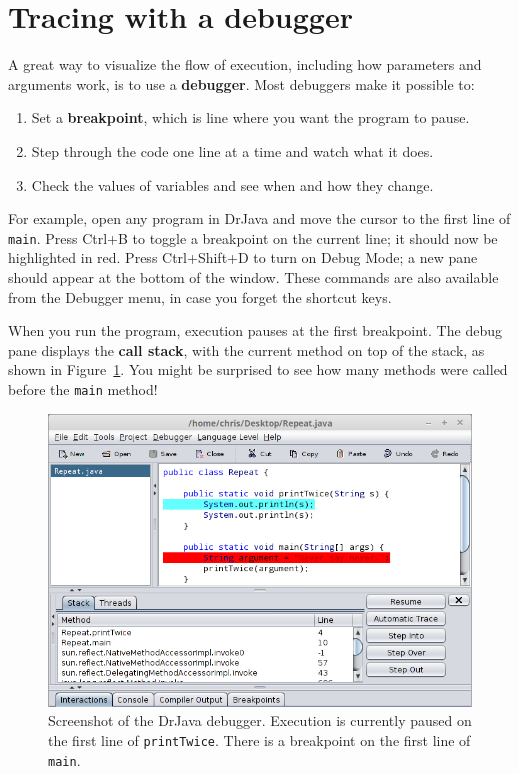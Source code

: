 \documentclass[12pt]{book}
\theoremstyle{exercise}
\newcommand{\java}[1]{\verb"#1"}
\begin{document}
\section{Tracing with a debugger}
\label{debugger}


A great way to visualize the flow of execution, including how parameters and arguments work, is to use a {\bf debugger}.
Most debuggers make it possible to:


\begin{enumerate}
\item Set a {\bf breakpoint}, which is line where you want the program to pause.
\item Step through the code one line at a time and watch what it does.
\item Check the values of variables and see when and how they change.
\end{enumerate}

For example, open any program in DrJava and move the cursor to the first line of \java{main}.
Press {\sf Ctrl+B} to toggle a breakpoint on the current line; it should now be highlighted in red.
Press {\sf Ctrl+Shift+D} to turn on Debug Mode; a new pane should appear at the bottom of the window.
These commands are also available from the {\sf Debugger} menu, in case you forget the shortcut keys.


When you run the program, execution pauses at the first breakpoint.
The debug pane displays the {\bf call stack}, with the current method on top of the stack, as shown in Figure~\ref{fig.debugger}.
You might be surprised to see how many methods were called before the \java{main} method!

\begin{figure}[!ht]
\begin{center}
\includegraphics[width=\textwidth]{figs/debugger.png}
\caption{Screenshot of the DrJava debugger.
Execution is currently paused on the first line of \java{printTwice}.
There is a breakpoint on the first line of \java{main}.}
\label{fig.debugger}
\end{center}
\end{figure}
\end{document}
